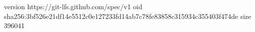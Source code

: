 version https://git-lfs.github.com/spec/v1
oid sha256:3bf526e21df14e5512c0e127233fd14ab7c78fe83858c315934c355403f474de
size 396041
